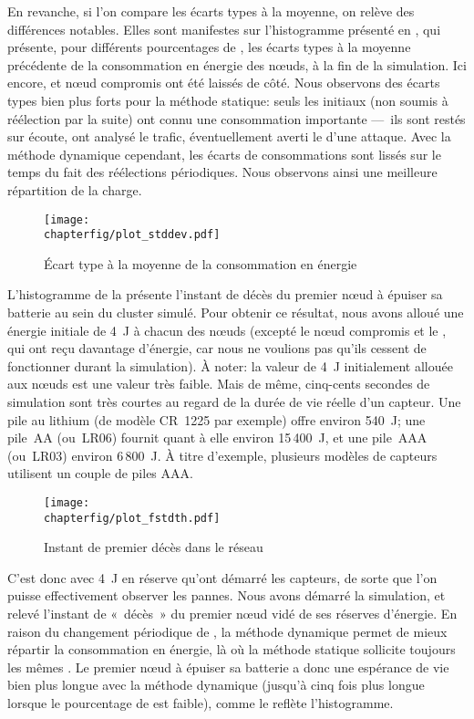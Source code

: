 En revanche, si l'on compare les écarts types à la moyenne, on relève des différences notables.
Elles sont manifestes sur l'histogramme présenté en , qui présente, pour différents pourcentages de \cns, les écarts types à la moyenne précédente de la consommation en énergie des nœuds, à la fin de la simulation.
Ici encore, \ch et nœud compromis ont été laissés de côté.
Nous observons des écarts types bien plus forts pour la méthode statique: seuls les \cns initiaux (non soumis à réélection par la suite) ont connu une consommation importante ---~ils sont restés sur écoute, ont analysé le trafic, éventuellement averti le \ch d'une attaque.
Avec la méthode dynamique cependant, les écarts de consommations sont lissés sur le temps du fait des réélections périodiques.
Nous observons ainsi une meilleure répartition de la charge.
\begin{figure}[ht]
    \centering
    \texttt{[image: \\chapterfig/plot\_stddev.pdf]}
    \caption{Écart type à la moyenne de la consommation en énergie}\label{sa:fig:conso-ecart-type}
\end{figure}

L'histogramme de la  présente l'instant de décès du premier nœud à épuiser sa batterie au sein du cluster simulé.
Pour obtenir ce résultat, nous avons alloué une énergie initiale de 4~J à chacun des nœuds (excepté le nœud compromis et le \ch, qui ont reçu davantage d'énergie, car nous ne voulions pas qu'ils cessent de fonctionner durant la simulation).
À noter: la valeur de 4~J initialement allouée aux nœuds est une valeur très faible.
Mais de même, cinq-cents secondes de simulation sont très courtes au regard de la durée de vie réelle d'un capteur.
Une pile au lithium (de modèle CR~1225 par exemple) offre environ 540~J; une pile~AA (ou~LR06) fournit quant à elle environ 15\,400~J, et une pile~AAA (ou~LR03) environ 6\,800~J.
À titre d'exemple, plusieurs modèles de capteurs utilisent un couple de piles AAA.
\begin{figure}[ht]
    \centering
    \texttt{[image: \\chapterfig/plot\_fstdth.pdf]}
    \caption{Instant de premier décès dans le réseau}\label{sa:fig:premier-deces}
\end{figure}
%

C'est donc avec 4~J en réserve qu'ont démarré les capteurs, de sorte que l'on puisse effectivement observer les pannes.
Nous avons démarré la simulation, et relevé l'instant de « décès » du premier nœud vidé de ses réserves d'énergie.
En raison du changement périodique de \cns, la méthode dynamique permet de mieux répartir la consommation en énergie, là où la méthode statique sollicite toujours les mêmes \cns.
Le premier nœud à épuiser sa batterie a donc une espérance de vie bien plus longue avec la méthode dynamique (jusqu'à cinq fois plus longue lorsque le pourcentage de \cns est faible), comme le reflète l'histogramme.

